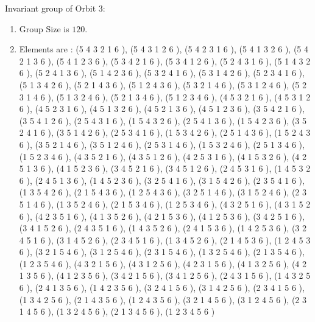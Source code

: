 \documentclass[12pt]{article}
\begin{document}
Invariant group of Orbit $3$:
\begin{enumerate}
\item Group Size is $120$.
\item Elements are : (5 4 3 2 1 6  ), (5 4 3 1 2 6  ), (5 4 2 3 1 6  ), (5 4 1 3 2 6  ), (5 4 2 1 3 6  ), (5 4 1 2 3 6  ), (5 3 4 2 1 6  ), (5 3 4 1 2 6  ), (5 2 4 3 1 6  ), (5 1 4 3 2 6  ), (5 2 4 1 3 6  ), (5 1 4 2 3 6  ), (5 3 2 4 1 6  ), (5 3 1 4 2 6  ), (5 2 3 4 1 6  ), (5 1 3 4 2 6  ), (5 2 1 4 3 6  ), (5 1 2 4 3 6  ), (5 3 2 1 4 6  ), (5 3 1 2 4 6  ), (5 2 3 1 4 6  ), (5 1 3 2 4 6  ), (5 2 1 3 4 6  ), (5 1 2 3 4 6  ), (4 5 3 2 1 6  ), (4 5 3 1 2 6  ), (4 5 2 3 1 6  ), (4 5 1 3 2 6  ), (4 5 2 1 3 6  ), (4 5 1 2 3 6  ), (3 5 4 2 1 6  ), (3 5 4 1 2 6  ), (2 5 4 3 1 6  ), (1 5 4 3 2 6  ), (2 5 4 1 3 6  ), (1 5 4 2 3 6  ), (3 5 2 4 1 6  ), (3 5 1 4 2 6  ), (2 5 3 4 1 6  ), (1 5 3 4 2 6  ), (2 5 1 4 3 6  ), (1 5 2 4 3 6  ), (3 5 2 1 4 6  ), (3 5 1 2 4 6  ), (2 5 3 1 4 6  ), (1 5 3 2 4 6  ), (2 5 1 3 4 6  ), (1 5 2 3 4 6  ), (4 3 5 2 1 6  ), (4 3 5 1 2 6  ), (4 2 5 3 1 6  ), (4 1 5 3 2 6  ), (4 2 5 1 3 6  ), (4 1 5 2 3 6  ), (3 4 5 2 1 6  ), (3 4 5 1 2 6  ), (2 4 5 3 1 6  ), (1 4 5 3 2 6  ), (2 4 5 1 3 6  ), (1 4 5 2 3 6  ), (3 2 5 4 1 6  ), (3 1 5 4 2 6  ), (2 3 5 4 1 6  ), (1 3 5 4 2 6  ), (2 1 5 4 3 6  ), (1 2 5 4 3 6  ), (3 2 5 1 4 6  ), (3 1 5 2 4 6  ), (2 3 5 1 4 6  ), (1 3 5 2 4 6  ), (2 1 5 3 4 6  ), (1 2 5 3 4 6  ), (4 3 2 5 1 6  ), (4 3 1 5 2 6  ), (4 2 3 5 1 6  ), (4 1 3 5 2 6  ), (4 2 1 5 3 6  ), (4 1 2 5 3 6  ), (3 4 2 5 1 6  ), (3 4 1 5 2 6  ), (2 4 3 5 1 6  ), (1 4 3 5 2 6  ), (2 4 1 5 3 6  ), (1 4 2 5 3 6  ), (3 2 4 5 1 6  ), (3 1 4 5 2 6  ), (2 3 4 5 1 6  ), (1 3 4 5 2 6  ), (2 1 4 5 3 6  ), (1 2 4 5 3 6  ), (3 2 1 5 4 6  ), (3 1 2 5 4 6  ), (2 3 1 5 4 6  ), (1 3 2 5 4 6  ), (2 1 3 5 4 6  ), (1 2 3 5 4 6  ), (4 3 2 1 5 6  ), (4 3 1 2 5 6  ), (4 2 3 1 5 6  ), (4 1 3 2 5 6  ), (4 2 1 3 5 6  ), (4 1 2 3 5 6  ), (3 4 2 1 5 6  ), (3 4 1 2 5 6  ), (2 4 3 1 5 6  ), (1 4 3 2 5 6  ), (2 4 1 3 5 6  ), (1 4 2 3 5 6  ), (3 2 4 1 5 6  ), (3 1 4 2 5 6  ), (2 3 4 1 5 6  ), (1 3 4 2 5 6  ), (2 1 4 3 5 6  ), (1 2 4 3 5 6  ), (3 2 1 4 5 6  ), (3 1 2 4 5 6  ), (2 3 1 4 5 6  ), (1 3 2 4 5 6  ), (2 1 3 4 5 6  ), (1 2 3 4 5 6  )
\end{enumerate}
\end{document}
